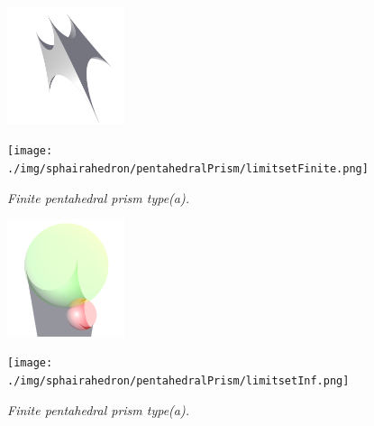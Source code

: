 \documentclass[suppldata, dvipdfmx]{interact}
\theoremstyle{plain}%
\theoremstyle{definition}
\theoremstyle{remark}
\theoremstyle{problemstyle}
\begin{document}
\begin{figure}[h!tbp]
 \begin{minipage}{0.5\textwidth}
  \begin{minipage}[t]{0.24\textwidth}
   \centering
   \includegraphics[width=1.35in, height=1.35in, keepaspectratio]{./img/sphairahedron/pentahedralPrism/sphairahedronFinite.png}
  \end{minipage}
  \hspace*{\fill}
  \begin{minipage}[t]{0.24\textwidth}
   \centering
   \texttt{[image: ./img/sphairahedron/pentahedralPrism/limitsetFinite.png]}
  \end{minipage}
  \hspace*{\fill}
  \caption{\textit{Finite pentahedral prism type(a).}}
  \label{fig:pentahedralPrismFinite}
 \end{minipage}
 \hspace*{\fill}
 \begin{minipage}{0.5\textwidth}
  \begin{minipage}[t]{0.24\textwidth}
   \centering
   \includegraphics[width=1.35in, height=1.35in, keepaspectratio]{./img/sphairahedron/pentahedralPrism/sphairahedronInf.png}
  \end{minipage}
  \hspace*{\fill}
  \begin{minipage}[t]{0.24\textwidth}
   \centering
   \texttt{[image: ./img/sphairahedron/pentahedralPrism/limitsetInf.png]}
   \label{fig:pentahedralPrismInfPositiveLimit}
  \end{minipage}
  \hspace*{\fill}
  \caption{\textit{Finite pentahedral prism type(a).}}
  \label{fig:pentahedralPrismInfPositive}
 \end{minipage}
\end{figure}
\end{document}
